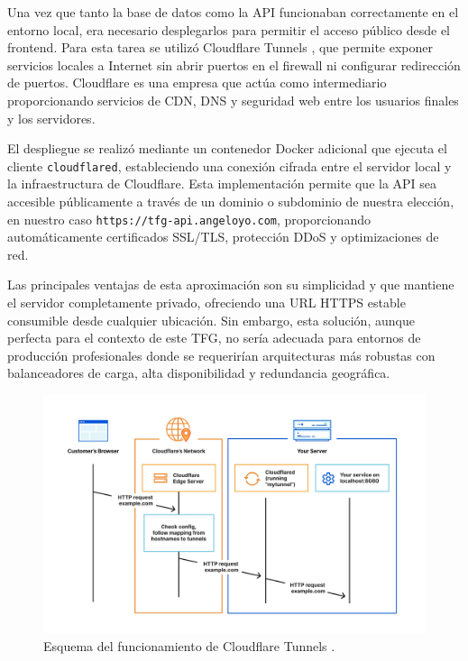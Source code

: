 Una vez que tanto la base de datos como la API funcionaban correctamente en el entorno local, era necesario desplegarlos para permitir el acceso público desde el frontend. Para esta tarea se utilizó Cloudflare Tunnels \cite{cloudflaretunnels}, que permite exponer servicios locales a Internet sin abrir puertos en el firewall ni configurar redirección de puertos. Cloudflare \cite{cloudflare} es una empresa que actúa como intermediario proporcionando servicios de CDN, DNS y seguridad web entre los usuarios finales y los servidores.

El despliegue se realizó mediante un contenedor Docker adicional que ejecuta el cliente \texttt{cloudflared}, estableciendo una conexión cifrada entre el servidor local y la infraestructura de Cloudflare. Esta implementación permite que la API sea accesible públicamente a través de un dominio o subdominio de nuestra elección, en nuestro caso \texttt{https://tfg-api.angeloyo.com}, proporcionando automáticamente certificados SSL/TLS, protección DDoS y optimizaciones de red.

Las principales ventajas de esta aproximación son su simplicidad y que mantiene el servidor completamente privado, ofreciendo una URL HTTPS estable consumible desde cualquier ubicación. Sin embargo, esta solución, aunque perfecta para el contexto de este TFG, no sería adecuada para entornos de producción profesionales donde se requerirían arquitecturas más robustas con balanceadores de carga, alta disponibilidad y redundancia geográfica.  


\begin{figure}[H]
  \centering
  \includegraphics[width=1\textwidth]{imagenes/cloudflared.png}
  \caption{Esquema del funcionamiento de Cloudflare Tunnels \cite{cloudflaretunnels}.}
  \label{fig:cloudflared}
\end{figure}


